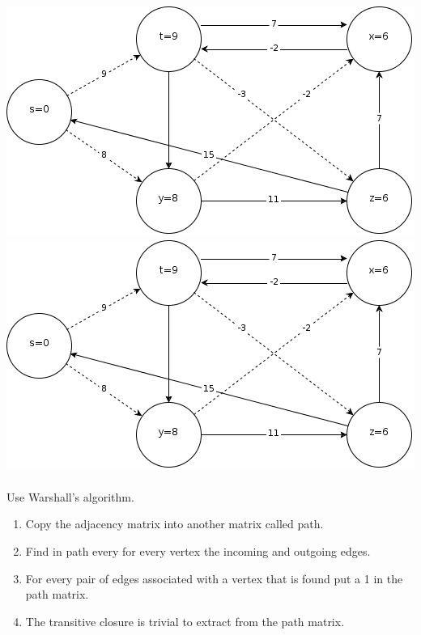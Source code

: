 \documentclass[11pt]{article}
\begin{document}
		\includegraphics[scale=.5]{BF2.png}\\
		\includegraphics[scale=.5]{BF2.png}\\
	\bigskip
	\\	
		Use Warshall's algorithm.
		\begin{enumerate}
			\item Copy the adjacency matrix into another matrix called path.
			\item Find in path every for every vertex the incoming and outgoing edges.
			\item For every pair of edges associated with a vertex that is found put a 1 in the path matrix.
			\item The transitive closure is trivial to extract from the path matrix.
		\end{enumerate}
\end{document}
